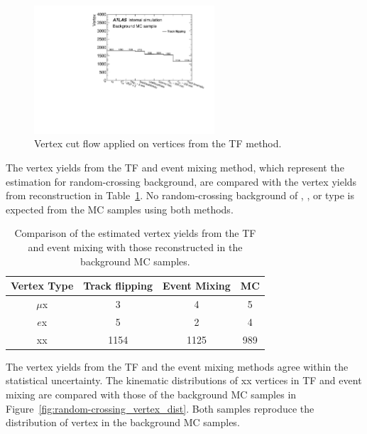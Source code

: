 \begin{figure}[!htb]
	\includegraphics[width=0.60\textwidth]{figures/m_FBE_cutflow_MC.pdf}
	\centering
	\caption{Vertex cut flow applied on \xx vertices from the TF method.}
	\label{fig:m_FBE_cutflow_MC}
\end{figure}

The vertex yields from the TF and event mixing method, which represent the estimation for random-crossing background, are compared with the vertex yields from reconstruction in Table~\ref{table:random_vertex_count}. No random-crossing background of \mumu, \ee, or \emu type is expected from the MC samples using both methods. 
 
\begin{table}[!htb]
  \centering
  \begin{tabular}{ c  c c c }
    \hline
    \hline
	Vertex Type					&Track flipping	    &   Event Mixing 	    & MC                    \\
    \hline
	$\mu$x						&	3			    &	4        			&	5					\\
	$e$x						&	5			    &	2   				&	4					\\
	xx						    &	1154		    &	1125 				&	989 				\\
    \hline
    \hline
  \end{tabular}
  \caption{Comparison of the estimated vertex yields from the TF and event mixing with those reconstructed in the background MC samples.}
  \label{table:random_vertex_count}
\end{table}

The vertex yields from the TF and the event mixing methods agree within the statistical uncertainty. The kinematic distributions of xx vertices in TF and event mixing are compared with those of the background MC samples in Figure~\ref{fig:random-crossing_vertex_dist}. Both samples reproduce the distribution of vertex in the background MC samples.


